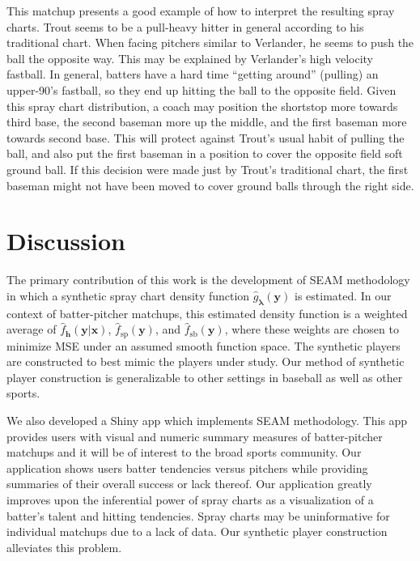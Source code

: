 \documentclass[12pt]{article}
\newcommand{\y}{\textbf{y}}
\newcommand{\x}{\textbf{x}}
\newcommand{\h}{\textbf{h}}
\newcommand{\lambdabf}{\boldsymbol{\lambda}}
\begin{document}
This matchup presents a good example of how to interpret the resulting spray charts. Trout seems to be a pull-heavy hitter in general according to his traditional chart. When facing pitchers similar to Verlander, he seems to push the ball the opposite way. This may be explained by Verlander's high velocity fastball. In general, batters have a hard time ``getting around'' (pulling) an upper-90's fastball, so they end up hitting the ball to the opposite field. Given this spray chart distribution, a coach may position the shortstop more towards third base, the second baseman more up the middle, and the first baseman more towards second base. This will protect against Trout's usual habit of pulling the ball, and also put the first baseman in a position to cover the opposite field soft ground ball. If this decision were made just by Trout's traditional chart, the first baseman might not have been moved to cover ground balls through the right side.





\section{Discussion}

The primary contribution of this work is the development of SEAM methodology in which a synthetic spray chart density function $\hat{g}_{\lambdabf}(\y)$ is estimated. In our context of batter-pitcher matchups, this estimated density function is a weighted average of $\hat f_\h(\y|\x)$, $\hat f_{\text{sp}}(\y)$, and $\hat f_{\text{sb}}(\y)$, where these weights are chosen to minimize MSE under an assumed smooth function space. The synthetic players are constructed to best mimic the players under study. Our method of synthetic player construction is generalizable to other settings in baseball as well as other sports.

We also developed a Shiny app which implements SEAM methodology. This app provides users with visual and numeric summary measures of batter-pitcher matchups and it will be of interest to the broad sports community. Our application shows users batter tendencies versus pitchers while providing summaries of their overall success or lack thereof. Our application greatly improves upon the inferential power of spray charts \citep{pettispray, marchi2019analyzing} as a visualization of a batter's talent and hitting tendencies. Spray charts may be uninformative for individual matchups due to a lack of data. Our synthetic player construction alleviates this problem.
\end{document}
